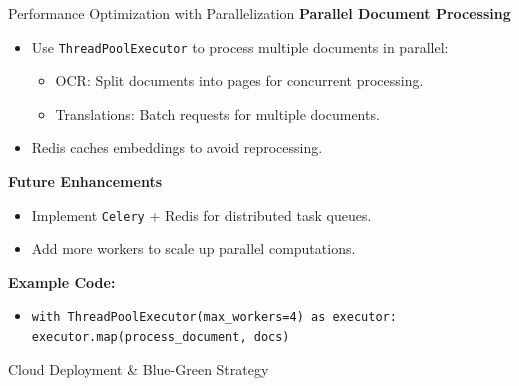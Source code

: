 \documentclass[notes]{beamer}
\begin{document}
{

\begin{frame}{Performance Optimization with Parallelization}
    \textbf{Parallel Document Processing}
    \begin{itemize}
        \item Use \texttt{ThreadPoolExecutor} to process multiple documents in parallel:
        \begin{itemize}
            \item OCR: Split documents into pages for concurrent processing.
            \item Translations: Batch requests for multiple documents.
        \end{itemize}
        \item Redis caches embeddings to avoid reprocessing.
    \end{itemize}
    \textbf{Future Enhancements}
    \begin{itemize}
        \item Implement \texttt{Celery} + Redis for distributed task queues.
        \item Add more workers to scale up parallel computations.
    \end{itemize}
    \textbf{Example Code:}
    \begin{itemize}
        \item
        \begin{scriptsize}
        \texttt{with ThreadPoolExecutor(max\_workers=4) as executor:}  
        \texttt{executor.map(process\_document, docs)}
        \end{scriptsize}
    \end{itemize}
\end{frame}


\begin{frame}{Cloud Deployment \& Blue-Green Strategy}
    \begin{columns}[T]
        \begin{column}{0.5\textwidth}
            \centering
\end{column}
\end{columns}
\end{frame}}
\end{document}
